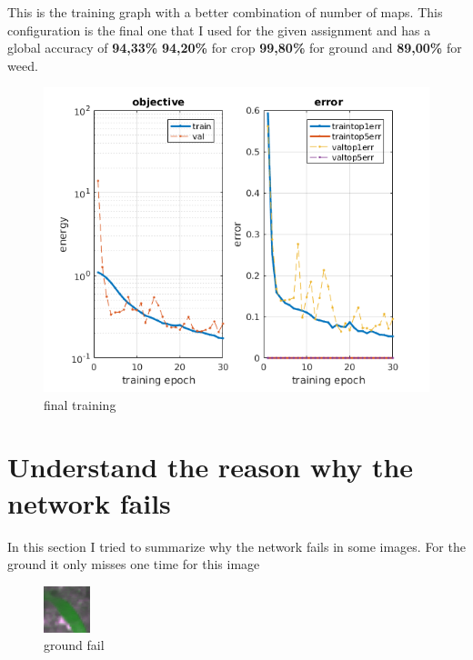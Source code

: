 \documentclass[]{report}
\begin{document}
\newpage   
This is the training graph with a better combination of number of maps. This configuration is the final one that I used for the given assignment and has a global accuracy of \textbf{94,33\%} \textbf{94,20\%} for crop \textbf{99,80\%} for ground and \textbf{89,00\%} for weed.

\begin{figure}[h]
	\begin{center}
		\includegraphics[scale=0.6]{final.png}
		\caption{final training}
		\label{fig:FinalTraining}
	\end{center}
\end{figure}

\newpage
\section{Understand the reason why the network fails}

In this section I tried to summarize why the network fails in some images. For the ground it only misses one time for this image

\begin{figure}[h]
	\begin{center}
		\includegraphics[scale=1]{ground_fails/ground_fail.png}
		\caption{ground fail}
		\label{fig:GroundFail}
	\end{center}
\end{figure}
\end{document}
